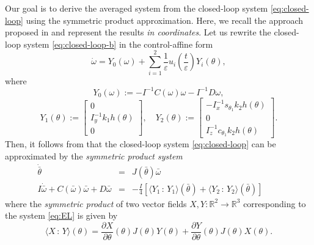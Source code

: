 \documentclass{ifacconf}
\begin{document}
Our goal is to derive the averaged system from the closed-loop system \eqref{eq:closed-loop} using the symmetric product approximation. Here, we recall the approach proposed in \cite{bullo2002averaging,bullo2019geometric} and represent the results \textit{in coordinates}. Let us rewrite the closed-loop system \eqref{eq:closed-loop-b} in the control-affine form
\begin{equation}
    \dot{\omega}=Y_0(\omega)
    +\sum_{i=1}^2 \frac{1}{\varepsilon}u_i\left(\frac{t}{\varepsilon}\right)Y_i(\theta),
\end{equation}
where
\begin{equation*}
    Y_0(\omega):=-I^{-1}C(\omega)\omega-I^{-1}D\omega,
\end{equation*}
\begin{equation*}
    Y_1(\theta):=\begin{bmatrix}
        0\\ I_y^{-1}k_1h(\theta)\\ 0
    \end{bmatrix},\quad
    Y_2(\theta):=\begin{bmatrix}
        -I_x^{-1}s_{\theta_1} k_2h(\theta)\\ 0\\ I_z^{-1}c_{\theta_1}k_2h(\theta)
    \end{bmatrix}.
\end{equation*}
Then, it follows from \cite{bullo2002averaging,wang2023underactuated} that the closed-loop system  \eqref{eq:closed-loop} can be approximated by the \textit{symmetric product system}
\begin{subequations}
  \label{eq:AEL}
  \begin{eqnarray}
       \dot{\bar{\theta}} &=&J(\bar{\theta})\bar{\omega}  \label{eq:AEL-a}\\
       I\dot{\bar{\omega}}+C(\bar{\omega})\bar{\omega} + D\bar{\omega}&=&-\frac{I}{4} \left[\langle Y_1{\,:\,}Y_1\rangle(\bar{\theta}) + \langle Y_2{\,:\,} Y_2\rangle(\bar{\theta}) \right]\quad\quad\label{eq:AEL-b}
  \end{eqnarray}
\end{subequations}
where the \textit{symmetric product} of two vector fields $X,Y\colon \mathbb{R}^2\to \mathbb{R}^3$ corresponding
to the system \eqref{eq:EL} is given by
\begin{equation}
    \langle X{\,:\,}Y \rangle(\theta) =\frac{\partial X}{\partial \theta}(\theta)J(\theta)Y(\theta) + \frac{\partial Y}{\partial \theta}(\theta)J(\theta)X(\theta).
\end{equation}
\end{document}
